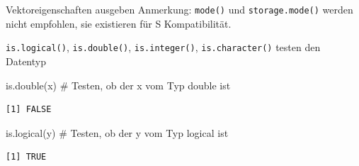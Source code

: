 \documentclass[
  8pt,
  ignorenonframetext,
]{beamer}
\newenvironment{Shaded}{\begin{snugshade}}{\end{snugshade}}
\newcommand{\CommentTok}[1]{\textcolor[rgb]{0.37,0.37,0.37}{#1}}
\newcommand{\FunctionTok}[1]{\textcolor[rgb]{0.28,0.35,0.67}{#1}}
\newcommand{\NormalTok}[1]{\textcolor[rgb]{0.00,0.23,0.31}{#1}}
\begin{document}
\begin{frame}[fragile]{Vektoreigenschaften ausgeben}
\indent Anmerkung: \texttt{mode()} und \texttt{storage.mode()} werden
nicht empfohlen, sie existieren für S Kompatibilität.

\vspace{3mm}
\small

\texttt{is.logical()}, \texttt{is.double()}, \texttt{is.integer()},
\texttt{is.character()} testen den Datentyp

\tiny

\begin{Shaded}
\begin{Highlighting}[]
\FunctionTok{is.double}\NormalTok{(x)       }\CommentTok{\# Testen, ob der x vom Typ double ist}
\end{Highlighting}
\end{Shaded}

\begin{verbatim}
[1] FALSE
\end{verbatim}

\vspace{2mm}

\begin{Shaded}
\begin{Highlighting}[]
\FunctionTok{is.logical}\NormalTok{(y)      }\CommentTok{\# Testen, ob der y vom Typ logical ist}
\end{Highlighting}
\end{Shaded}

\begin{verbatim}
[1] TRUE
\end{verbatim}
\end{frame}
\end{document}
